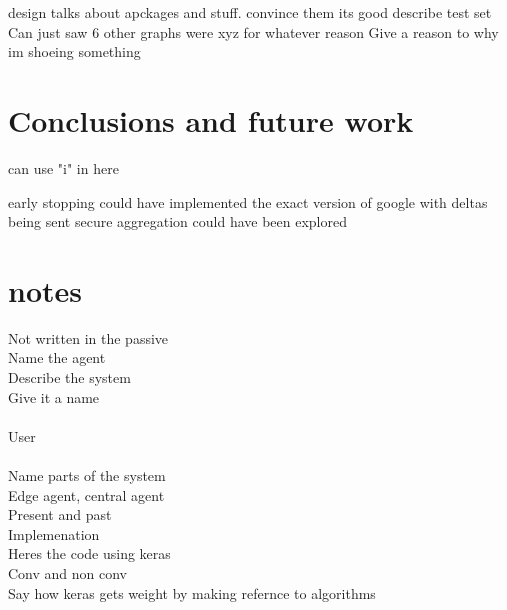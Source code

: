 \documentclass[12pt]{article}
\begin{document}
design talks about apckages and stuff. convince them its good
describe test set
Can just saw 6 other graphs were xyz for whatever reason
Give a reason to why im shoeing something

\clearpage
\section{Conclusions and future work}
can use "i" in here

early stopping
could have implemented the exact version of google with deltas being sent
secure aggregation could have been explored


\section{notes}
Not written in the passive\\
	Name the agent\\
	Describe the system\\
		Give it a name\\\\
		User\\\\
		Name parts of the system\\ 
		Edge agent, central agent\\
Present and past\\
Implemenation\\
Heres the code using keras
\\Conv and non conv
\\Say how keras gets weight by making refernce to algorithms
\\\\
\clearpage
\printbibliography[title={Bibliography}]
\end{document}

